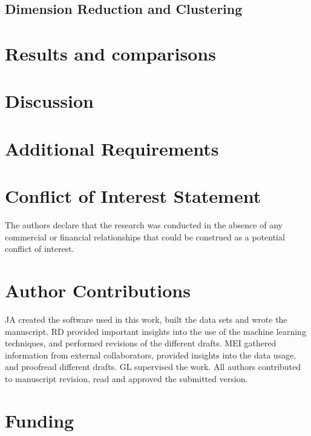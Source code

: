 \documentclass[utf8]{frontiersSCNS} %
\begin{document}
\subsection{Dimension Reduction and Clustering}


\section{Results and comparisons}
\label{sec:results}


\section{Discussion}


\section{Additional Requirements}

\section*{Conflict of Interest Statement}

The authors declare that the research was conducted in the absence of any commercial or financial relationships that could be construed as a potential conflict of interest.

\section*{Author Contributions}

JA created the software used in this work, built the data sets and wrote the manuscript. RD provided important insights into the use of the machine learning techniques, and performed revisions of the different drafts. MEI gathered information from external collaborators, provided insights into the data usage, and proofread different drafts. GL supervised the work. All authors contributed to manuscript revision, read and approved the submitted version.

\section*{Funding}
\end{document}
